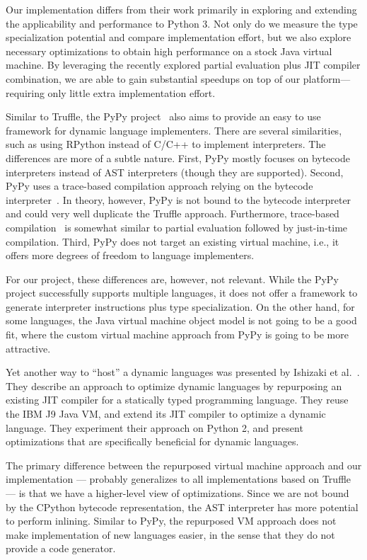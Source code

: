 Our implementation differs from their work primarily in exploring and extending the applicability and performance to Python 3.
Not only do we measure the type specialization potential and compare implementation effort, but we also explore necessary optimizations to obtain high performance on a stock Java virtual machine.
By leveraging the recently explored partial evaluation plus JIT compiler combination,
we are able to gain substantial speedups on top of our platform---requiring only little extra implementation effort.

Similar to Truffle, the PyPy project~\cite{Rigo2006} also aims to provide an easy to use framework for dynamic language implementers.
There are several similarities, such as using RPython instead of C/C++ to implement interpreters.
The differences are more of a subtle nature.
First, PyPy mostly  focuses on bytecode interpreters instead of AST interpreters (though they are supported).
Second, PyPy uses a trace-based compilation approach relying on the bytecode interpreter~\cite{bolz.etal09}.
In theory, however, PyPy is not bound to the bytecode interpreter and could very well duplicate the Truffle approach.
Furthermore, trace-based compilation~\cite{gal.etal+09,chang.etal+09} is somewhat similar to partial evaluation followed by just-in-time compilation.
Third, PyPy does not target an existing virtual machine, i.e., it offers more degrees of freedom to language implementers.

For our project, these differences are, however, not relevant.
While the PyPy project successfully supports multiple languages, it does not offer a framework to generate interpreter instructions plus type specialization.
On the other hand, for some languages, the Java virtual machine object model is not going to be a good fit, where the custom virtual machine approach from PyPy is going to be more attractive.

Yet another way to ``host'' a dynamic languages was presented by Ishizaki et al.~\cite{Ishizaki.etal+12}.
They describe an approach to optimize dynamic languages by repurposing an existing JIT compiler for a statically typed programming language.
They reuse the IBM J9 Java VM, and extend its JIT compiler to optimize a dynamic language.
They experiment their approach on Python 2, and present optimizations that are specifically beneficial for dynamic languages.

The primary difference between the repurposed virtual machine approach and our implementation --- probably generalizes to all implementations based on Truffle --- is that we have a higher-level view of optimizations.
Since we are not bound by the CPython bytecode representation, the AST interpreter has more potential to perform inlining.
Similar to PyPy, the repurposed VM approach does not make implementation of new languages easier, in the sense that they do not provide a code generator.

